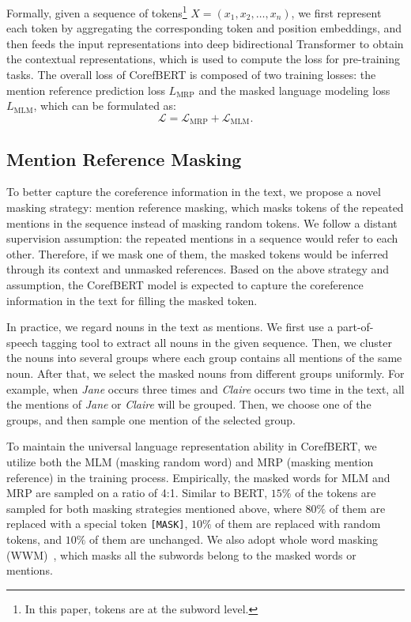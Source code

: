 \documentclass[11pt,a4paper]{article}
\newcommand\CorefBERT{CorefBERT\xspace}
\begin{document}
Formally, given a sequence of tokens\footnote{In this paper, tokens are at the subword level.} ${X} = (x_1, x_2, \ldots, x_n)$, we first represent each token by aggregating the corresponding token and position embeddings, and then feeds the input representations into deep bidirectional Transformer to obtain the contextual representations, which is used to compute the loss for pre-training tasks. The overall loss of \CorefBERT is composed of two training losses: the mention reference prediction loss $L_{\text{MRP}}$ and the masked language modeling loss $L_{\text{MLM}}$, which can be formulated as:
\begin{equation}
    \mathcal{L} = \mathcal{L}_{\text{MRP}} +  \mathcal{L}_{\text{MLM}}.
\end{equation}







\subsection{Mention Reference Masking}

To better capture the coreference information in the text, we propose a novel masking strategy: mention reference masking, which masks tokens of the repeated mentions in the sequence instead of masking random tokens. We follow a distant supervision assumption: the repeated mentions in a sequence would refer to each other. Therefore, if we mask one of them, the masked tokens would be inferred through its context and  unmasked references. Based on the above strategy and assumption, the CorefBERT model is expected to capture the coreference information in the text for filling the masked token. 


In practice, we regard nouns in the text as mentions. We first use a part-of-speech tagging tool to extract all nouns in the given sequence. 
Then, we cluster the nouns into several groups where each group contains all mentions of the same noun. After that, we select the masked nouns from different groups uniformly. For example, when \emph{Jane} occurs three times and \emph{Claire} occurs two time in the text, all the mentions of \emph{Jane} or \emph{Claire} will be grouped.  Then, we choose one of the groups, and then sample one mention of the selected group.


To maintain the universal language representation ability in \CorefBERT, we utilize both the MLM (masking random word) and MRP (masking mention reference)  in the training process. Empirically, the masked words for MLM and MRP are sampled on a ratio of 4:1. Similar to BERT, $15\%$ of the tokens are sampled for both masking strategies mentioned above, where $80\%$ of them are replaced with a special token \texttt{[MASK]}, 
$10\%$ of them are replaced with random tokens, and $10\%$ of them are unchanged.
We also adopt whole word masking (WWM)~\citep{Spanbert}, which masks all the subwords belong to the masked words or mentions.
\end{document}
